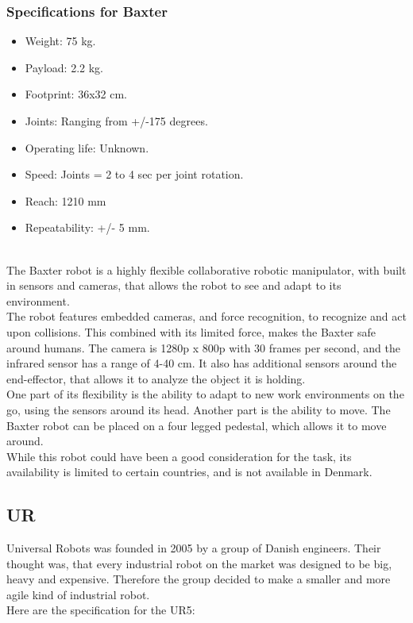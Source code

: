 \subsubsection{Specifications for Baxter}
\begin{itemize}
    \item Weight: 75 kg.
    \item Payload: 2.2 kg.
    \item Footprint: 36x32 cm.
    \item Joints: Ranging from +/-175 degrees.
    \item Operating life: Unknown.
    \item Speed: Joints = 2 to 4 sec per joint rotation.
    \item Reach: 1210 mm
    \item Repeatability: +/- 5 mm.
\end{itemize}
\cite{Rethinkspec}
\\
The Baxter robot is a highly flexible collaborative robotic manipulator, with built in sensors and cameras, that allows the robot to see and adapt to its environment.\\
The robot features embedded cameras, and force recognition, to recognize and act upon collisions. This combined with its limited force, makes the Baxter safe around humans.
The camera is 1280p x 800p with 30 frames per second, and the infrared sensor has a range of 4-40 cm. 
It also has additional sensors around the end-effector, that allows it to analyze the object it is holding. \\
One part of its flexibility is the ability to adapt to new work environments on the go, using the sensors around its head. Another part is the ability to move. The Baxter robot can be placed on a four legged pedestal, which allows it to move around. \\
While this robot could have been a good consideration for the task, its availability is limited to certain countries, and is not available in Denmark\cite{rethinkbaxter}.

\subsection{UR}

Universal Robots was founded in 2005 by a group of Danish engineers. Their thought was, that every industrial robot on the market was designed to be big, heavy and expensive. Therefore the group decided to make a smaller and more agile kind of industrial robot.\cite{Urhist}\\
Here are the specification for the UR5:\\ 

